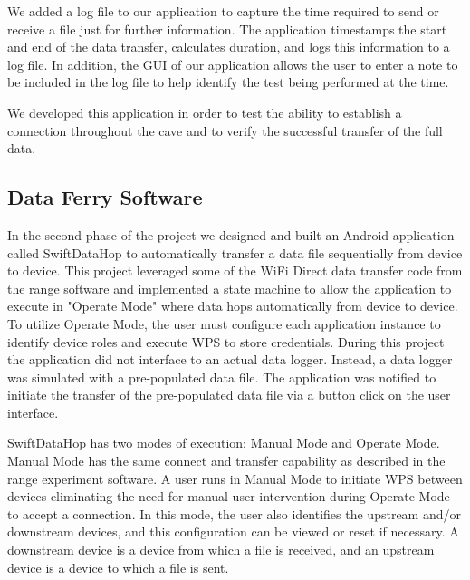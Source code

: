 \documentclass[10pt,twocolumn]{article}
\begin{document}
We added a log file to our application to capture the time required to send or receive a file just for further information.
The application timestamps the start and end of the data transfer, calculates duration, and logs this information to a log file.
In addition, the GUI of our application allows the user to enter a note to be included in the log file to help identify the test being performed at the time.

We developed this application in order to test the ability to establish a connection throughout the cave and to verify the successful transfer of the full data.

\subsection{Data Ferry Software}
\label{sec:Data Ferry Software}
In the second phase of the project we designed and built an Android application called SwiftDataHop to automatically transfer a data file sequentially from device to device. 
This project leveraged some of the WiFi Direct data transfer code from the range software and implemented a state machine to allow the application to execute in "Operate Mode" where data hops automatically from device to device. 
To utilize Operate Mode, the user must configure each application instance to identify device roles and execute WPS to store credentials.
During this project the application did not interface to an actual data logger.
Instead, a data logger was simulated with a pre-populated data file.
The application was notified to initiate the transfer of the pre-populated data file via a button click on the user interface.

SwiftDataHop has two modes of execution: Manual Mode and Operate Mode.
Manual Mode has the same connect and transfer capability as described in the range experiment software.
A user runs in Manual Mode to initiate WPS between devices eliminating the need for manual user intervention during Operate Mode to accept a connection.
In this mode, the user also identifies the upstream and/or downstream devices, 
and this configuration can be viewed or reset if necessary.
A downstream device is a device from which a file is received, and an upstream device is a device to which a file is sent.
\end{document}
